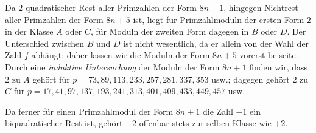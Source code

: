 Da $2$ quadratischer Rest aller Primzahlen der Form $8n+1$, hingegen Nichtrest aller Primzahlen der Form $8n+5$ ist, liegt für Primzahlmoduln der ersten Form $2$ in der Klasse $A$ oder $C$, für Moduln der zweiten Form dagegen in $B$ oder $D$. Der Unterschied zwischen $B$ und $D$ ist nicht wesentlich, da er allein von der Wahl der Zahl $f$ abhängt; daher lassen wir die Moduln der Form $8n+5$ vorerst beiseite. Durch eine \emph{induktive Untersuchung} der Moduln der Form $8n+1$ finden wir, dass $2$ zu $A$ gehört für $p=73,89,113,233,257,281,337,353$ usw.; dagegen gehört $2$ zu $C$ für $p=17,41,97,137,193,241,313,401,409,433,449,457$ usw.

Da ferner für einen Primzahlmodul der Form $8n+1$ die Zahl $-1$ ein biquadratischer Rest ist, gehört $-2$ offenbar stets zur selben Klasse wie $+2$.

